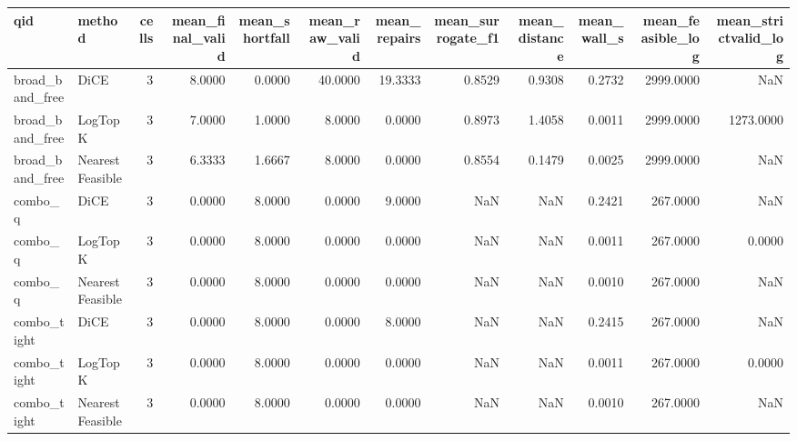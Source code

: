 \begin{tabular}{llrrrrrrrrrr}
\toprule
                 qid &          method &  cells &  mean\_final\_valid &  mean\_shortfall &  mean\_raw\_valid &  mean\_repairs &  mean\_surrogate\_f1 &  mean\_distance &  mean\_wall\_s &  mean\_feasible\_log &  mean\_strictvalid\_log \\
\midrule
     broad\_band\_free &            DiCE &      3 &            8.0000 &          0.0000 &         40.0000 &       19.3333 &             0.8529 &         0.9308 &       0.2732 &          2999.0000 &                   NaN \\
     broad\_band\_free &         LogTopK &      3 &            7.0000 &          1.0000 &          8.0000 &        0.0000 &             0.8973 &         1.4058 &       0.0011 &          2999.0000 &             1273.0000 \\
     broad\_band\_free & NearestFeasible &      3 &            6.3333 &          1.6667 &          8.0000 &        0.0000 &             0.8554 &         0.1479 &       0.0025 &          2999.0000 &                   NaN \\
             combo\_q &            DiCE &      3 &            0.0000 &          8.0000 &          0.0000 &        9.0000 &                NaN &            NaN &       0.2421 &           267.0000 &                   NaN \\
             combo\_q &         LogTopK &      3 &            0.0000 &          8.0000 &          0.0000 &        0.0000 &                NaN &            NaN &       0.0011 &           267.0000 &                0.0000 \\
             combo\_q & NearestFeasible &      3 &            0.0000 &          8.0000 &          0.0000 &        0.0000 &                NaN &            NaN &       0.0010 &           267.0000 &                   NaN \\
         combo\_tight &            DiCE &      3 &            0.0000 &          8.0000 &          0.0000 &        8.0000 &                NaN &            NaN &       0.2415 &           267.0000 &                   NaN \\
         combo\_tight &         LogTopK &      3 &            0.0000 &          8.0000 &          0.0000 &        0.0000 &                NaN &            NaN &       0.0011 &           267.0000 &                0.0000 \\
         combo\_tight & NearestFeasible &      3 &            0.0000 &          8.0000 &          0.0000 &        0.0000 &                NaN &            NaN &       0.0010 &           267.0000 &                   NaN \\

\end{tabular}
